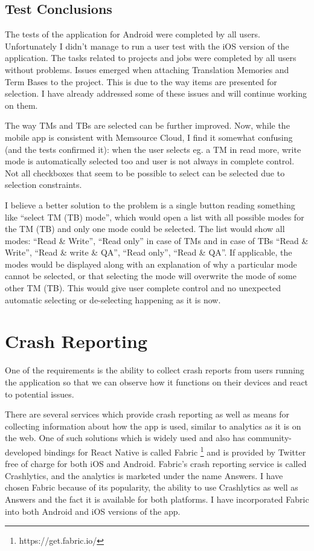 \subsection{Test Conclusions}

The tests of the application for Android were completed by all users. Unfortunately I didn't manage to run a user test with the iOS version of the application. The tasks related to projects and jobs were completed by all users without problems. Issues emerged when attaching Translation Memories and Term Bases to the project. This is due to the way items are presented for selection. I have already addressed some of these issues and will continue working on them.

The way TMs and TBs are selected can be further improved. Now, while the mobile app is consistent with Memsource Cloud, I find it somewhat confusing (and the tests confirmed it): when the user selects eg. a TM in read more, write mode is automatically selected too and user is not always in complete control. Not all checkboxes that seem to be possible to select can be selected due to selection constraints.

I believe a better solution to the problem is a single button reading something like “select TM (TB) mode”, which would open a list with all possible modes for the TM (TB) and only one mode could be selected. The list would show all modes: “Read \& Write”, “Read only” in case of TMs and in case of TBs “Read \& Write”, “Read \& write \& QA”, “Read only”, “Read \& QA”. If applicable, the modes would be displayed along with an explanation of why a particular mode cannot be selected, or that selecting the mode will overwrite the mode of some other TM (TB). This would give user complete control and no unexpected automatic selecting or de-selecting happening as it is now.


\section{Crash Reporting}


One of the requirements is the ability to collect crash reports from users running the application so that we can observe how it functions on their devices and react to potential issues. 

There are several services which provide crash reporting as well as means for collecting information about how the app is used, similar to analytics as it is on the web. One of such solutions which is widely used and also has community-developed bindings for React Native is called Fabric \footnote{https://get.fabric.io/} and is provided by Twitter free of charge for both iOS and Android. Fabric's crash reporting service is called Crashlytics, and the analytics is marketed under the name Answers. I have chosen Fabric because of its popularity, the ability to use Crashlytics as well as Answers and the fact it is available for both platforms. I have incorporated Fabric into both Android and iOS versions of the app. 

